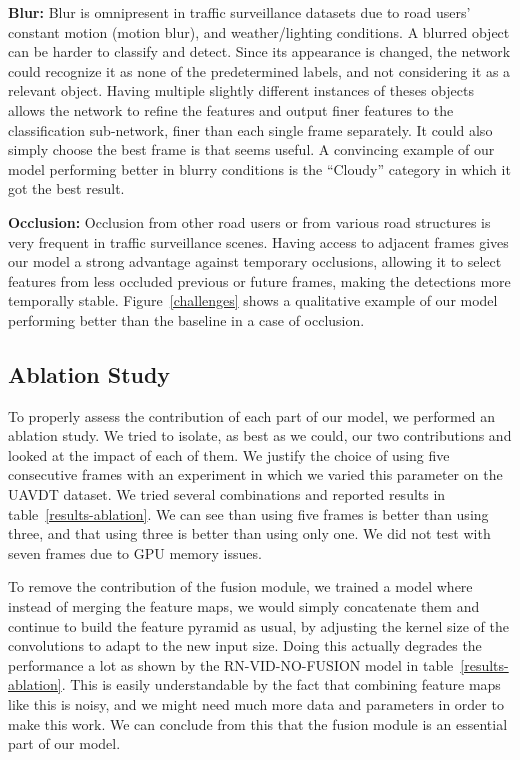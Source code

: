 \documentclass[runningheads]{llncs}
\begin{document}
\textbf{Blur:} Blur is omnipresent in traffic surveillance datasets due to road users’ constant motion (motion blur), and weather/lighting conditions. A blurred object can be harder to classify and detect. Since its appearance is changed, the network could recognize it as none of the predetermined labels, and not considering it as a relevant object. Having multiple slightly different instances of theses objects allows the network to refine the features and output finer features to the classification sub-network, finer than each single frame separately. It could also simply choose the best frame is that seems useful. A convincing example of our model performing better in blurry conditions is the ``Cloudy'' category in which it got the best result.

\textbf{Occlusion:} Occlusion from other road users or from various road structures is very frequent in traffic surveillance scenes. Having access to adjacent frames gives our model a strong advantage against temporary occlusions, allowing it to select features from less occluded previous or future frames, making the detections more temporally stable. Figure~\ref{challenges} shows a qualitative example of our model performing better than the baseline in a case of occlusion.   

\subsection{Ablation Study}

To properly assess the contribution of each part of our model, we performed an ablation study. We tried to isolate, as best as we could, our two contributions and looked at the impact of each of them. We justify the choice of using five consecutive frames with an experiment in which we varied this parameter on the UAVDT dataset. We tried several combinations and reported results in table~\ref{results-ablation}. We can see than using five frames is better than using three, and that using three is better than using only one. We did not test with seven frames due to GPU memory issues.

To remove the contribution of the fusion module, we trained a model where instead of merging the feature maps, we would simply concatenate them and continue to build the feature pyramid as usual, by adjusting the kernel size of the convolutions to adapt to the new input size. Doing this actually degrades the performance a lot as shown by the RN-VID-NO-FUSION model in table~\ref{results-ablation}. This is easily understandable by the fact that combining feature maps like this is noisy, and we might need much more data and parameters in order to make this work. We can conclude from this that the fusion module is an essential part of our model.
\end{document}
